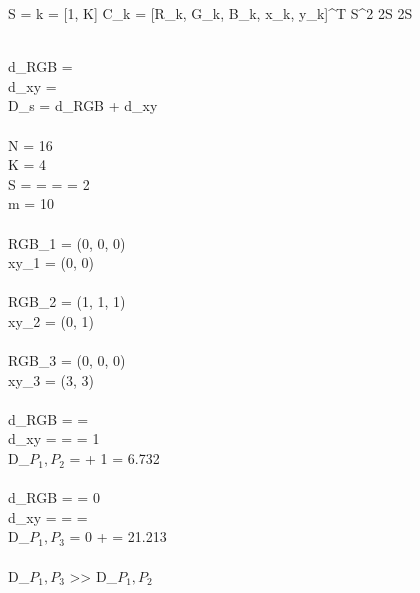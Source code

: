 %
%

S = 
k = [1, K]
C_k = [R_k, G_k, B_k, x_k, y_k]^T
S^2
2S \times 2S

\\
d_{RGB} =  \\
d_{xy} =  \\
D_s = d_{RGB} + d_{xy}\\

\\
N = 16 \\
K = 4 \\
S =  =  =  = 2 \\
m = 10 \\

\\
RGB_1 = (0, 0, 0) \\
xy_1 = (0, 0) \\ \\
RGB_2 = (1, 1, 1) \\
xy_2 = (0, 1) \\ \\
RGB_3 = (0, 0, 0) \\
xy_3 = (3, 3) \\

\\
d_{RGB} =  =  \\
d_{xy} =  =  = 1 \\
D_{\(P_1, P_2\)} =  + 1 = 6.732 \\
\\
d_{RGB} =  = 0 \\
d_{xy} =  =  =  \\
D_{\(P_1, P_3\)} = 0 +  = 21.213 \\
\\
D_{\(P_1, P_3\)} >> D_{\(P_1, P_2\)} 
